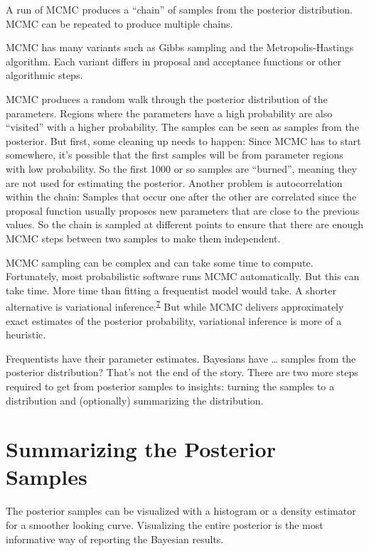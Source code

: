 \documentclass[
  10pt,
]{scrbook}
\begin{document}
A run of MCMC produces a ``chain'' of samples from the posterior distribution.
MCMC can be repeated to produce multiple chains.

MCMC has many variants such as Gibbs sampling and the Metropolis-Hastings algorithm.
Each variant differs in proposal and acceptance functions or other algorithmic steps.

MCMC produces a random walk through the posterior distribution of the parameters.
Regions where the parameters have a high probability are also ``visited'' with a higher probability.
The samples can be seen as samples from the posterior.
But first, some cleaning up needs to happen:
Since MCMC has to start somewhere, it's possible that the first samples will be from parameter regions with low probability.
So the first 1000 or so samples are ``burned'', meaning they are not used for estimating the posterior.
Another problem is autocorrelation within the chain:
Samples that occur one after the other are correlated since the proposal function usually proposes new parameters that are close to the previous values.
So the chain is sampled at different points to ensure that there are enough MCMC steps between two samples to make them independent.

MCMC sampling can be complex and can take some time to compute.
Fortunately, most probabilistic software runs MCMC automatically.
But this can take time.
More time than fitting a frequentist model would take.
A shorter alternative is variational inference.\textsuperscript{\protect\hyperlink{ref-blei2017variational}{7}}
But while MCMC delivers approximately exact estimates of the posterior probability, variational inference is more of a heuristic.

Frequentists have their parameter estimates.
Bayesians have \ldots{} samples from the posterior distribution?
That's not the end of the story.
There are two more steps required to get from posterior samples to insights: turning the samples to a distribution and (optionally) summarizing the distribution.

\hypertarget{summarizing-the-posterior-samples}{%
\section{Summarizing the Posterior Samples}\label{summarizing-the-posterior-samples}}

The posterior samples can be visualized with a histogram or a density estimator for a smoother looking curve.
Visualizing the entire posterior is the most informative way of reporting the Bayesian results.
\end{document}
